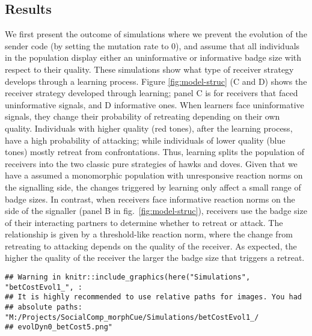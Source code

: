 \documentclass[
  12pt,
]{article}
\begin{document}
\hypertarget{results}{%
\subsection{Results}\label{results}}

We first present the outcome of simulations where we prevent the
evolution of the sender code (by setting the mutation rate to \(0\)),
and assume that all individuals in the population display either an
uninformative or informative badge size with respect to their quality.
These simulations show what type of receiver strategy develops through a
learning process. Figure \ref{fig:model-struc} (C and D) shows the
receiver strategy developed through learning; panel C is for receivers
that faced uninformative signals, and D informative ones. When learners
face uninformative signals, they change their probability of retreating
depending on their own quality. Individuals with higher quality (red
tones), after the learning process, have a high probability of
attacking; while individuals of lower quality (blue tones) mostly
retreat from confrontations. Thus, learning splits the population of
receivers into the two classic pure strategies of hawks and doves. Given
that we have a assumed a monomorphic population with unresponsive
reaction norms on the signalling side, the changes triggered by learning
only affect a small range of badge sizes. In contrast, when receivers
face informative reaction norms on the side of the signaller (panel B in
fig.~\ref{fig:model-struc}), receivers use the badge size of their
interacting partners to determine whether to retreat or attack. The
relationship is given by a threshold-like reaction norm, where the
change from retreating to attacking depends on the quality of the
receiver. As expected, the higher the quality of the receiver the larger
the badge size that triggers a retreat.

\begin{verbatim}
## Warning in knitr::include_graphics(here("Simulations", "betCostEvol1_", :
## It is highly recommended to use relative paths for images. You had
## absolute paths: "M:/Projects/SocialComp_morphCue/Simulations/betCostEvol1_/
## evolDyn0_betCost5.png"
\end{verbatim}
\end{document}

